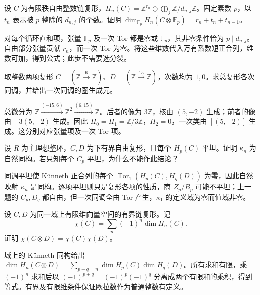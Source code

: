 \begin{exercise}\label{b4:ex:09-modp-betti}
	设 \(C\) 为有限秩自由整数链复形，\(H_n(C)=\mathbb Z^{r_n}\oplus\bigoplus_j\mathbb Z/d_{n,j}\mathbb Z\)。固定素数 \(p\)，以 \(t_n\) 表示被 \(p\) 整除的 \(d_{n,j}\) 的个数。证明 \(\dim_{\mathbb F_p}H_n(C\otimes\mathbb F_p)=r_n+t_n+t_{n-1}\)。
\end{exercise}
\begin{solution}
	对每个循环直和项，张量 \(\mathbb F_p\) 及一次 Tor 都是零或 \(\mathbb F_p\)，其非零条件恰为 \(p\mid d_{n,j}\)。自由部分张量贡献 \(r_n\)，而一次 Tor 为零。将这些维数代入万有系数短正合列，维数可加，得到公式；此步不需要选分裂。
\end{solution}

\begin{exercise}\label{b4:ex:09-kunneth-numbers}
	取整数两项复形 \(C=(\mathbb Z\xrightarrow{6}\mathbb Z)\)、\(D=(\mathbb Z\xrightarrow{15}\mathbb Z)\)，次数均为 \(1,0\)。求总复形各次同调，并给出一次同调的圈生成元。
\end{exercise}
\begin{solution}
	总微分为 \(\mathbb Z\xrightarrow{(-15,6)}\mathbb Z^2\xrightarrow{(6,15)}\mathbb Z\)。后者的像为 \(3\mathbb Z\)，核由 \((5,-2)\) 生成；前者的像由 \(-3(5,-2)\) 生成。因此 \(H_0=H_1=\mathbb Z/3\mathbb Z\)，\(H_2=0\)，一次类由 \([(5,-2)]\) 生成。这分别对应张量项及一次 Tor 项。
\end{solution}

\begin{exercise}\label{b4:ex:09-kunneth-flat-homology}
	设 \(R\) 为主理想整环，\(C,D\) 为下有界自由复形，且每个 \(H_p(C)\) 平坦。证明 \(\kappa_n\) 为自然同构。若只知每个 \(C_p\) 平坦，为什么不能作此结论？
\end{exercise}
\begin{solution}
	同调平坦使 Künneth 正合列的每个 \(\operatorname{Tor}_1(H_p(C),H_q(D))\) 为零，因此自然映射 \(\kappa_n\) 是同构。逐项平坦则只是复形各项的性质，商 \(Z_p/B_p\) 可能不平坦；上一题的 \(C_p,D_q\) 都自由，但一次同调全由 Tor 产生，\(\kappa_1\) 的定义域为零而值域非零。
\end{solution}

\begin{exercise}\label{b4:ex:09-euler-tensor}
	设 \(C,D\) 为同一域上有限维向量空间的有界链复形。记
	\[
		\chi(C)=\sum_n(-1)^n\dim H_n(C).
	\]
	证明 \(\chi(C\otimes D)=\chi(C)\chi(D)\)。
\end{exercise}
\begin{solution}
	域上的 Künneth 同构给出 \(\dim H_n(C\otimes D)=\sum_{p+q=n}\dim H_p(C)\dim H_q(D)\)。所有求和有限，乘 \((-1)^n\) 求和后以 \((-1)^{p+q}=(-1)^p(-1)^q\) 分离成两个有限和的乘积，得到等式。有界及有限维条件保证欧拉数作为普通整数有定义。
\end{solution}

